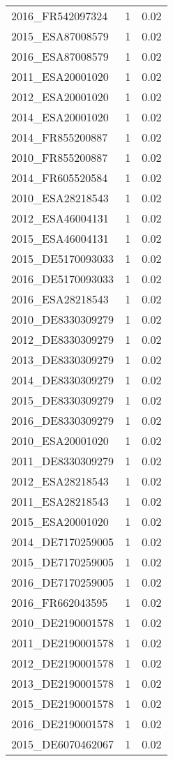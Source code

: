 \begin{table*}[htbp]
\begin{tabular}{lrr}
2016_FR542097324 & 1 & 0.02 \\
2015_ESA87008579 & 1 & 0.02 \\
2016_ESA87008579 & 1 & 0.02 \\
2011_ESA20001020 & 1 & 0.02 \\
2012_ESA20001020 & 1 & 0.02 \\
2014_ESA20001020 & 1 & 0.02 \\
2014_FR855200887 & 1 & 0.02 \\
2010_FR855200887 & 1 & 0.02 \\
2014_FR605520584 & 1 & 0.02 \\
2010_ESA28218543 & 1 & 0.02 \\
2012_ESA46004131 & 1 & 0.02 \\
2015_ESA46004131 & 1 & 0.02 \\
2015_DE5170093033 & 1 & 0.02 \\
2016_DE5170093033 & 1 & 0.02 \\
2016_ESA28218543 & 1 & 0.02 \\
2010_DE8330309279 & 1 & 0.02 \\
2012_DE8330309279 & 1 & 0.02 \\
2013_DE8330309279 & 1 & 0.02 \\
2014_DE8330309279 & 1 & 0.02 \\
2015_DE8330309279 & 1 & 0.02 \\
2016_DE8330309279 & 1 & 0.02 \\
2010_ESA20001020 & 1 & 0.02 \\
2011_DE8330309279 & 1 & 0.02 \\
2012_ESA28218543 & 1 & 0.02 \\
2011_ESA28218543 & 1 & 0.02 \\
2015_ESA20001020 & 1 & 0.02 \\
2014_DE7170259005 & 1 & 0.02 \\
2015_DE7170259005 & 1 & 0.02 \\
2016_DE7170259005 & 1 & 0.02 \\
2016_FR662043595 & 1 & 0.02 \\
2010_DE2190001578 & 1 & 0.02 \\
2011_DE2190001578 & 1 & 0.02 \\
2012_DE2190001578 & 1 & 0.02 \\
2013_DE2190001578 & 1 & 0.02 \\
2015_DE2190001578 & 1 & 0.02 \\
2016_DE2190001578 & 1 & 0.02 \\
2015_DE6070462067 & 1 & 0.02 \\

\end{tabular}
\end{table*}
